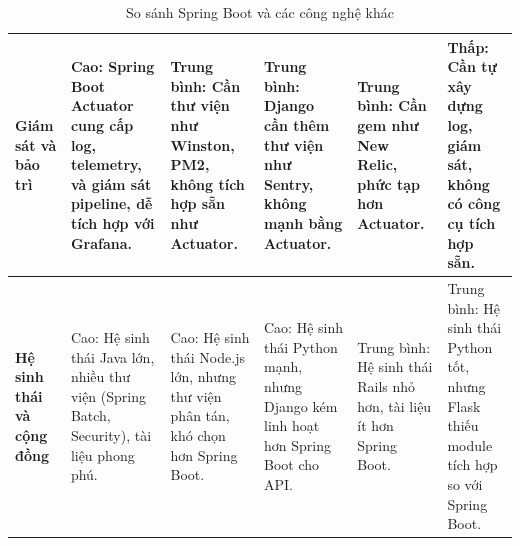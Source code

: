 \begin{landscape}
\begin{table}[h!]
\begin{tabularx}{\linewidth}{|l|X|X|X|X|X|}
\hline
\textbf{Giám sát và bảo trì} & Cao: Spring Boot Actuator cung cấp log, telemetry, và giám sát pipeline, dễ tích hợp với Grafana. & Trung bình: Cần thư viện như Winston, PM2, không tích hợp sẵn như Actuator. & Trung bình: Django cần thêm thư viện như Sentry, không mạnh bằng Actuator. & Trung bình: Cần gem như New Relic, phức tạp hơn Actuator. & Thấp: Cần tự xây dựng log, giám sát, không có công cụ tích hợp sẵn. \\
\hline
\textbf{Hệ sinh thái và cộng đồng} & Cao: Hệ sinh thái Java lớn, nhiều thư viện (Spring Batch, Security), tài liệu phong phú. & Cao: Hệ sinh thái Node.js lớn, nhưng thư viện phân tán, khó chọn hơn Spring Boot. & Cao: Hệ sinh thái Python mạnh, nhưng Django kém linh hoạt hơn Spring Boot cho API. & Trung bình: Hệ sinh thái Rails nhỏ hơn, tài liệu ít hơn Spring Boot. & Trung bình: Hệ sinh thái Python tốt, nhưng Flask thiếu module tích hợp so với Spring Boot. \\
\hline
\end{tabularx}
\caption{So sánh Spring Boot và các công nghệ khác}
\end{table}
\end{landscape}
